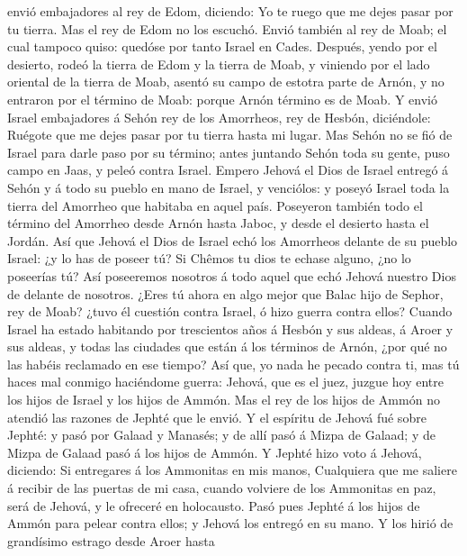 envió embajadores al rey de Edom, diciendo: Yo te ruego que me dejes
pasar por tu tierra. Mas el rey de Edom no los escuchó. Envió también al
rey de Moab; el cual tampoco quiso: quedóse por tanto Israel en Cades.
 Después, yendo por el desierto, rodeó la tierra de Edom y
la tierra de Moab, y viniendo por el lado oriental de la tierra de Moab,
asentó su campo de estotra parte de Arnón, y no entraron por el término
de Moab: porque Arnón término es de Moab.  Y envió Israel
embajadores á Sehón rey de los Amorrheos, rey de Hesbón, diciéndole:
Ruégote que me dejes pasar por tu tierra hasta mi lugar. 
Mas Sehón no se fió de Israel para darle paso por su término; antes
juntando Sehón toda su gente, puso campo en Jaas, y peleó contra Israel.
 Empero Jehová el Dios de Israel entregó á Sehón y á todo
su pueblo en mano de Israel, y venciólos: y poseyó Israel toda la tierra
del Amorrheo que habitaba en aquel país.  Poseyeron también
todo el término del Amorrheo desde Arnón hasta Jaboc, y desde el
desierto hasta el Jordán.  Así que Jehová el Dios de Israel
echó los Amorrheos delante de su pueblo Israel: ¿y lo has de poseer tú?
 Si Chêmos tu dios te echase alguno, ¿no lo poseerías tú?
Así poseeremos nosotros á todo aquel que echó Jehová nuestro Dios de
delante de nosotros.  ¿Eres tú ahora en algo mejor que
Balac hijo de Sephor, rey de Moab? ¿tuvo él cuestión contra Israel, ó
hizo guerra contra ellos?  Cuando Israel ha estado
habitando por trescientos años á Hesbón y sus aldeas, á Aroer y sus
aldeas, y todas las ciudades que están á los términos de Arnón, ¿por qué
no las habéis reclamado en ese tiempo?  Así que, yo nada he
pecado contra ti, mas tú haces mal conmigo haciéndome guerra: Jehová,
que es el juez, juzgue hoy entre los hijos de Israel y los hijos de
Ammón.  Mas el rey de los hijos de Ammón no atendió las
razones de Jephté que le envió.  Y el espíritu de Jehová
fué sobre Jephté: y pasó por Galaad y Manasés; y de allí pasó á Mizpa de
Galaad; y de Mizpa de Galaad pasó á los hijos de Ammón.  Y
Jephté hizo voto á Jehová, diciendo: Si entregares á los Ammonitas en
mis manos,  Cualquiera que me saliere á recibir de las
puertas de mi casa, cuando volviere de los Ammonitas en paz, será de
Jehová, y le ofreceré en holocausto.  Pasó pues Jephté á
los hijos de Ammón para pelear contra ellos; y Jehová los entregó en su
mano.  Y los hirió de grandísimo estrago desde Aroer hasta
